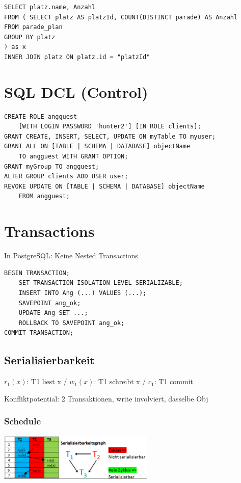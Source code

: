 \begin{multicols*}{3}
\begin{verbatim}
SELECT platz.name, Anzahl
FROM ( SELECT platz AS platzId, COUNT(DISTINCT parade) AS Anzahl
FROM parade_plan
GROUP BY platz
) as x
INNER JOIN platz ON platz.id = "platzId"
\end{verbatim}

\section{SQL DCL (Control)}
\begin{verbatim}
CREATE ROLE angguest
    [WITH LOGIN PASSWORD 'hunter2'] [IN ROLE clients];
GRANT CREATE, INSERT, SELECT, UPDATE ON myTable TO myuser;
GRANT ALL ON [TABLE | SCHEMA | DATABASE] objectName
    TO angguest WITH GRANT OPTION;
GRANT myGroup TO angguest;
ALTER GROUP clients ADD USER user;
REVOKE UPDATE ON [TABLE | SCHEMA | DATABASE] objectName
    FROM angguest;
\end{verbatim}

\section{Transactions}
In PostgreSQL: Keine Nested Transactions
\begin{verbatim}
BEGIN TRANSACTION;
    SET TRANSACTION ISOLATION LEVEL SERIALIZABLE;
    INSERT INTO Ang (...) VALUES (...);
    SAVEPOINT ang_ok;
    UPDATE Ang SET ...;
    ROLLBACK TO SAVEPOINT ang_ok;
COMMIT TRANSACTION;
\end{verbatim}


\subsection{Serialisierbarkeit}
$r_{1}(x)$: T1 liest x / $w_{1}(x)$: T1 schreibt x / $c_{1}$: T1 commit

Konfliktpotential: 2 Transaktionen, write involviert, dasselbe Obj

\newcommand{\ta}[2]{{\color{blue}#1_{1}#2}}
\newcommand{\tb}[2]{{\color{red}#1_{2}#2}}
\newcommand{\tc}[2]{{\color{green}#1_{3}#2}}

\subsubsection{Schedule}
\includegraphics[width=20em]{serial.png}


\end{multicols*}
